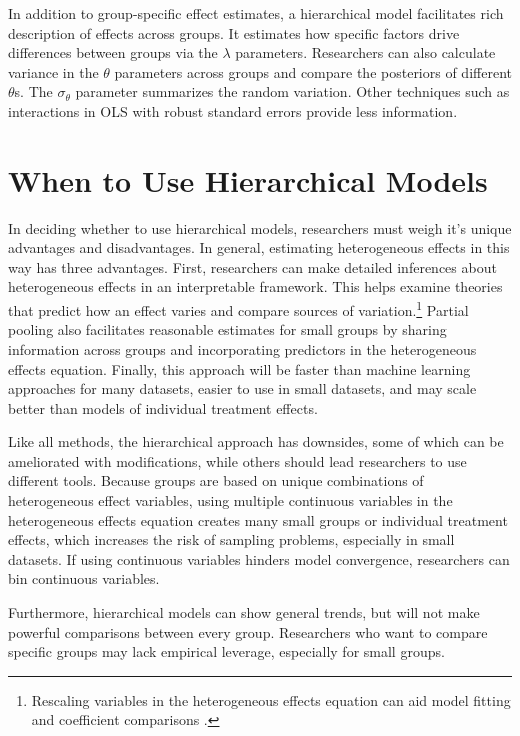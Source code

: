 \documentclass[12pt]{article}
\begin{document}
In addition to group-specific effect estimates, a hierarchical model facilitates rich description of effects across groups. 
It estimates how specific factors drive differences between groups via the $\lambda$ parameters.
Researchers can also calculate variance in the $\theta$ parameters across groups and compare the posteriors of different $\theta$s. 
The $\sigma_\theta$ parameter summarizes the random variation. 
Other techniques such as interactions in OLS with robust standard errors provide less information.


\section{When to Use Hierarchical Models}

In deciding whether to use hierarchical models, researchers must weigh it's unique advantages and disadvantages. 
In general, estimating heterogeneous effects in this way has three advantages.
First, researchers can make detailed inferences about heterogeneous effects in an interpretable framework. 
This helps examine theories that predict how an effect varies and compare sources of variation.\footnote{Rescaling variables in the heterogeneous effects equation can aid model fitting and coefficient comparisons \citep{Gelman2008}.} 
Partial pooling also facilitates reasonable estimates for small groups by sharing information across groups and incorporating predictors in the heterogeneous effects equation. 
Finally, this approach will be faster than machine learning approaches for many datasets, easier to use in small datasets, and may scale better than models of individual treatment effects.


Like all methods, the hierarchical approach has downsides, some of which can be ameliorated with modifications, while others should lead researchers to use different tools. 
Because groups are based on unique combinations of heterogeneous effect variables, using multiple continuous variables in the heterogeneous effects equation creates many small groups or individual treatment effects, which increases the risk of sampling problems, especially in small datasets. 
If using continuous variables hinders model convergence, researchers can bin continuous variables.


Furthermore, hierarchical models can show general trends, but will not make powerful comparisons between every group. 
Researchers who want to compare specific groups may lack empirical leverage, especially for small groups.
\end{document}
